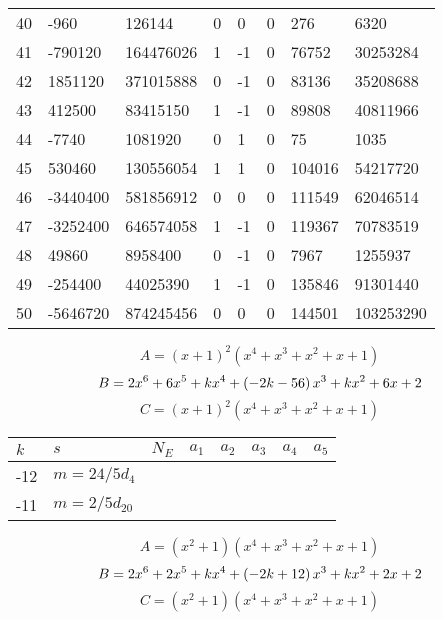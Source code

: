 \documentclass{amsart}
\begin{document}
\begin{longtable}{|l|l|l|lllll|}
40&-960&126144&0&0&0&276&6320\\
41&-790120&164476026&1&-1&0&76752&30253284\\
42&1851120&371015888&0&-1&0&83136&35208688\\
43&412500&83415150&1&-1&0&89808&40811966\\
44&-7740&1081920&0&1&0&75&1035\\
45&530460&130556054&1&1&0&104016&54217720\\
46&-3440400&581856912&0&0&0&111549&62046514\\
47&-3252400&646574058&1&-1&0&119367&70783519\\
48&49860&8958400&0&-1&0&7967&1255937\\
49&-254400&44025390&1&-1&0&135846&91301440\\
50&-5646720&874245456&0&0&0&144501&103253290\\
\hline
\end{longtable}
$$A=(x
 + 1)^{2}(x^4
 + x^3
 + x^2
 + x
 + 1)$$
$$B=2\*x^6
 + 6\*x^5
 + k\*x^4
 + \left(-2\*k
 - 56\right) \*x^3
 + k\*x^2
 + 6\*x
 + 2$$
$$C=(x
 + 1)^{2}(x^4
 + x^3
 + x^2
 + x
 + 1)$$
\begin{longtable}{|l|l|l|lllll|}
\hline
$k$ & $s$ & $N_E$ & $a_1$ & $a_2$ & $a_3$ & $a_4$ & $a_5$\\
\hline
-12&$m=24/5d_{4}$&&\multicolumn{5}{c|}{}\\
-11&$m=2/5d_{20}$&&\multicolumn{5}{c|}{}\\
\hline
\end{longtable}
$$A=(x^2
 + 1)(x^4
 + x^3
 + x^2
 + x
 + 1)$$
$$B=2\*x^6
 + 2\*x^5
 + k\*x^4
 + \left(-2\*k
 + 12\right) \*x^3
 + k\*x^2
 + 2\*x
 + 2$$
$$C=(x^2
 + 1)(x^4
 + x^3
 + x^2
 + x
 + 1)$$
\end{document}
